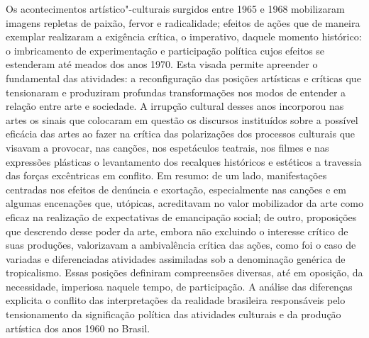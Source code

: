 \paginabranca
\movetooddpage
\thispagestyle{empty}
\setcounter{footnote}{0}
\begin{vplace}[0.25]

{\large{}}
\end{vplace}

\pagebreak
\thispagestyle{empty}

\movetooddpage


Os acontecimentos artístico"-culturais surgidos entre 1965 e 1968
mobilizaram imagens repletas de paixão, fervor e radicalidade; efeitos
de ações que de maneira exemplar realizaram a exigência crítica, o
imperativo, daquele momento histórico: o imbricamento de experimentação
e participação política cujos efeitos se estenderam até meados dos anos
1970. Esta visada permite apreender o fundamental das atividades: a
reconfiguração das posições artísticas e críticas que tensionaram e
produziram profundas transformações nos modos de entender a relação
entre arte e sociedade. A irrupção cultural desses anos incorporou nas
artes os sinais que colocaram em questão os discursos instituídos sobre
a possível eficácia das artes ao fazer na crítica das polarizações dos
processos culturais que visavam a provocar, nas canções, nos espetáculos
teatrais, nos filmes e nas expressões plásticas o levantamento dos
recalques históricos e estéticos a travessia das forças excêntricas em
conflito. Em resumo: de um lado, manifestações centradas nos efeitos de
denúncia e exortação, especialmente nas canções e em algumas encenações
que, utópicas, acreditavam no valor mobilizador da arte como eficaz na
realização de expectativas de emancipação social; de outro, proposições
que descrendo desse poder da arte, embora não excluindo o interesse
crítico de suas produções, valorizavam a ambivalência crítica das ações,
como foi o caso de variadas e diferenciadas atividades assimiladas sob a
denominação genérica de tropicalismo. Essas posições definiram
compreensões diversas, até em oposição, da necessidade, imperiosa
naquele tempo, de participação. A análise das diferenças explicita o
conflito das interpretações da realidade brasileira responsáveis pelo
tensionamento da significação política das atividades culturais e da
produção artística dos anos 1960 no Brasil.

